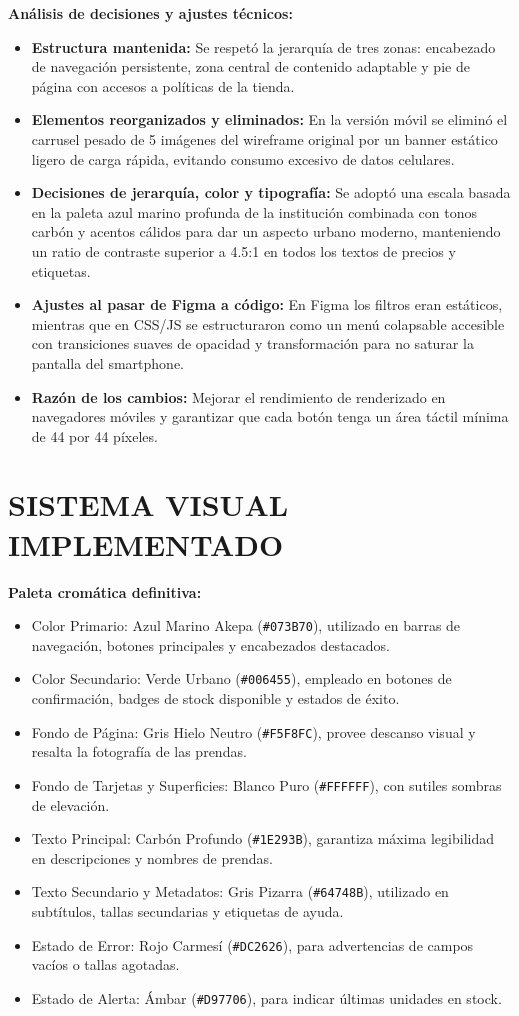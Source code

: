 \documentclass[12pt]{article}
\begin{document}
\textbf{Análisis de decisiones y ajustes técnicos:}
\begin{itemize}
    \item \textbf{Estructura mantenida:} Se respetó la jerarquía de tres zonas: encabezado de navegación persistente, zona central de contenido adaptable y pie de página con accesos a políticas de la tienda.
    \item \textbf{Elementos reorganizados y eliminados:} En la versión móvil se eliminó el carrusel pesado de 5 imágenes del wireframe original por un banner estático ligero de carga rápida, evitando consumo excesivo de datos celulares.
    \item \textbf{Decisiones de jerarquía, color y tipografía:} Se adoptó una escala basada en la paleta azul marino profunda de la institución combinada con tonos carbón y acentos cálidos para dar un aspecto urbano moderno, manteniendo un ratio de contraste superior a 4.5:1 en todos los textos de precios y etiquetas.
    \item \textbf{Ajustes al pasar de Figma a código:} En Figma los filtros eran estáticos, mientras que en CSS/JS se estructuraron como un menú colapsable accesible con transiciones suaves de opacidad y transformación para no saturar la pantalla del smartphone.
    \item \textbf{Razón de los cambios:} Mejorar el rendimiento de renderizado en navegadores móviles y garantizar que cada botón tenga un área táctil mínima de 44 por 44 píxeles.
\end{itemize}

\section*{SISTEMA VISUAL IMPLEMENTADO}
\textbf{Paleta cromática definitiva:}
\begin{itemize}
    \item Color Primario: Azul Marino Akepa (\texttt{\#073B70}), utilizado en barras de navegación, botones principales y encabezados destacados.
    \item Color Secundario: Verde Urbano (\texttt{\#006455}), empleado en botones de confirmación, badges de stock disponible y estados de éxito.
    \item Fondo de Página: Gris Hielo Neutro (\texttt{\#F5F8FC}), provee descanso visual y resalta la fotografía de las prendas.
    \item Fondo de Tarjetas y Superficies: Blanco Puro (\texttt{\#FFFFFF}), con sutiles sombras de elevación.
    \item Texto Principal: Carbón Profundo (\texttt{\#1E293B}), garantiza máxima legibilidad en descripciones y nombres de prendas.
    \item Texto Secundario y Metadatos: Gris Pizarra (\texttt{\#64748B}), utilizado en subtítulos, tallas secundarias y etiquetas de ayuda.
    \item Estado de Error: Rojo Carmesí (\texttt{\#DC2626}), para advertencias de campos vacíos o tallas agotadas.
    \item Estado de Alerta: Ámbar (\texttt{\#D97706}), para indicar últimas unidades en stock.
\end{itemize}
\end{document}
